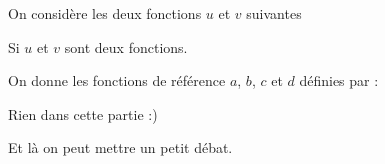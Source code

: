 \begin{activite}

\begin{partie}
On considère les deux fonctions $u$ et $v$ suivantes
\end{partie}

\begin{partie}
Si $u$ et $v$ sont deux fonctions.

On donne les fonctions de référence $a$, $b$, $c$ et $d$ définies par :
\end{partie}

\begin{partie}[Partie 3]
Rien dans cette partie :)
\end{partie}
\end{activite}

\begin{debat}
Et là on peut mettre un petit débat.
\end{debat}


